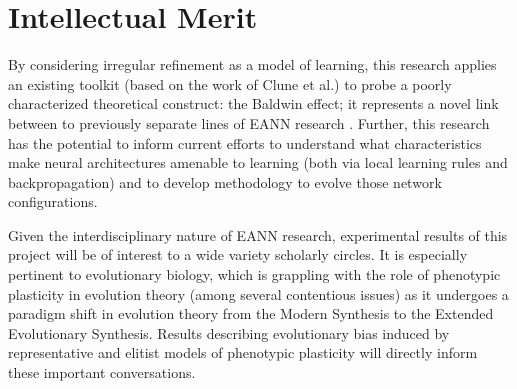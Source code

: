 \section{Intellectual Merit}
By considering irregular refinement as a model of learning, this research applies an existing toolkit (based on the work of Clune et al.) to probe a poorly characterized theoretical construct: the Baldwin effect; it represents a novel link between to previously separate lines of EANN research \autocite{Clune2011OnRegularity,Downing2010TheNetworks}.
Further, this research has the potential to inform current efforts to understand what characteristics make neural architectures amenable to learning (both via local learning rules and backpropagation) and to develop methodology to evolve those network configurations.

Given the interdisciplinary nature of EANN research, experimental results of this project will be of interest to a wide variety scholarly circles.
It is especially pertinent to evolutionary biology, which is grappling with the role of phenotypic plasticity in evolution theory (among several contentious issues) as it undergoes a paradigm shift in evolution theory from the Modern Synthesis to the Extended Evolutionary Synthesis\autocite{Pigliucci2008IsEvolvable}.
Results describing evolutionary bias induced by representative and elitist models of phenotypic plasticity will directly inform these important conversations.


